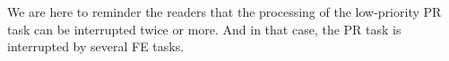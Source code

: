 We are here to reminder the readers that the processing of the low-priority PR task can be interrupted twice or more. And in that case, the PR task is interrupted by several FE tasks.


  
